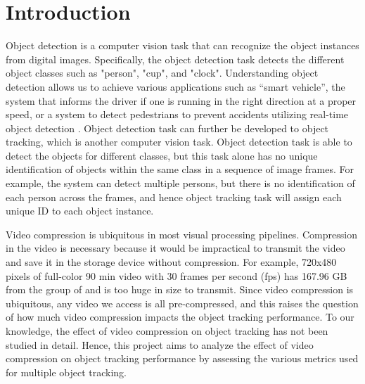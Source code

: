 \chapter{Introduction}
\label{chap:introduction}

Object detection is a computer vision task that can recognize the object instances from digital images. Specifically, the object detection task detects the different object classes such as "person", "cup", and "clock". Understanding object detection allows us to achieve various applications such as “smart vehicle”, the system that informs the driver if one is running in the right direction at a proper speed, or a system to detect pedestrians to prevent accidents utilizing real-time object detection \cite{gavrila_real-time_1999}. Object detection task can further be developed to object tracking, which is another computer vision task. Object detection task is able to detect the objects for different classes, but this task alone has no unique identification of objects within the same class in a sequence of image frames. For example, the system can detect multiple persons, but there is no identification of each person across the frames, and hence object tracking task will assign each unique ID to each object instance.

Video compression is ubiquitous in most visual processing pipelines. Compression in the video is necessary because it would be impractical to transmit the video and save it in the storage device without compression. For example, 720x480 pixels of full-color 90 min video with 30 frames per second (fps) has 167.96 GB from the group of \citeauthor{ponlatha_comparison_2013} \cite{ponlatha_comparison_2013} and is too huge in size to transmit. Since video compression is ubiquitous, any video we access is all pre-compressed, and this raises the question of how much video compression impacts the object tracking performance. To our knowledge, the effect of video compression on object tracking has not been studied in detail. Hence, this project aims to analyze the effect of video compression on object tracking performance by assessing the various metrics used for multiple object tracking.






